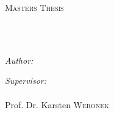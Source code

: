 \documentclass[
11pt, %
oneside, %
english, %
onehalfspacing, %
headsepline, %
]{MastersDoctoralThesis} %
\author{Parth \textsc{Desai}} %
\begin{document}
\frontmatter %

\pagestyle{plain} %


\begin{titlepage}
\begin{center}

\begin{figure}
\centering

\end{figure}

\vspace*{.04\textheight}
{\scshape\LARGE \univname\par}\vspace{1.5cm} %
\textsc{\Large Masters Thesis}\\[0.5cm] %

\HRule \\[0.4cm] %
{\huge \bfseries \ttitle\par}\vspace{0.4cm} %
\HRule \\[1.5cm] %
 
\begin{minipage}[t]{0.4\textwidth}
\begin{flushleft} \large
\emph{Author:}\\
\href{https://www.linkedin.com/in/parthdesai98/}{\authorname} %
\end{flushleft}
\end{minipage}
\begin{minipage}[t]{0.4\textwidth}
\begin{flushright} \large
\emph{Supervisor:} \\
{\supname} \\ %
Prof. Dr. Karsten \textsc{Weronek}\\
\end{flushright}
\end{minipage}\\[2cm]
 


\end{center}
\end{titlepage}
\end{document}
